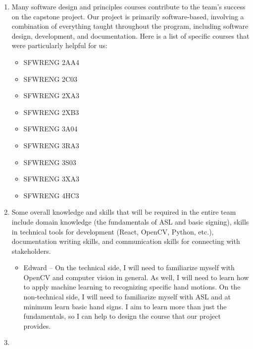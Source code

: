 \documentclass[12pt, titlepage]{article}
\begin{document}
\begin{enumerate}
    \item Many software design and principles courses contribute to the team's success on the capstone project. Our project is primarily software-based, involving a combination of everything taught throughout the program, including software design, development, and documentation. Here is a list of specific courses that were particularly helpful for us: 
    \begin{itemize}
        \item SFWRENG 2AA4
        \item SFWRENG 2C03
        \item SFWRENG 2XA3
        \item SFWRENG 2XB3
        \item SFWRENG 3A04
        \item SFWRENG 3RA3
        \item SFWRENG 3S03
        \item SFWRENG 3XA3
        \item SFWRENG 4HC3
    \end{itemize}
    \item Some overall knowledge and skills that will be required in the entire team include domain knowledge (the fundamentals of ASL and basic signing), skills in technical tools for development (React, OpenCV, Python, etc.), documentation writing skills, and communication skills for connecting with stakeholders.
    \begin{itemize}
        \item Edward -- On the technical side, I will need to familiarize myself with OpenCV and computer vision in general. As well, I will need to learn how to apply machine learning to recognizing specific hand motions. On the non-technical side, I will need to familiarize myself with ASL and at minimum learn basic hand signs. I aim to learn more than just the fundamentals, so I can help to design the course that our project provides.
    \end{itemize}
    \item 
\end{enumerate}
\end{document}
